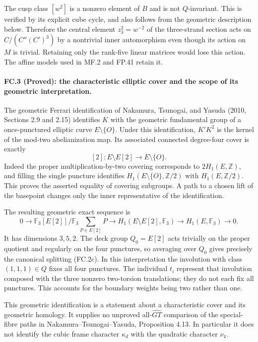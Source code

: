 The cusp class $[w^2]$ is a nonzero element of $B$ and is not
$Q$-invariant. This is verified by its explicit cube cycle, and
also follows from the geometric description below. Therefore the
central element $z_3^2=w^{-2}$ of the three-strand section acts
on $C/(C''(C')^3)$ by a nontrivial inner automorphism even though
its action on $M$ is trivial. Retaining only the rank-five linear
matrices would lose this action. The affine models used in MF.2
and FP.41 retain it.

\paragraph{FC.3 (Proved): the characteristic elliptic cover and the scope of its geometric interpretation.}
The geometric Ferrari identification of Nakamura, Tsunogai, and
Yasuda (2010, Sections 2.9 and 2.15) identifies $K$ with the
geometric fundamental group of a once-punctured elliptic curve
$E\setminus\{O\}$. Under this identification, $K'K^2$ is the
kernel of the mod-two abelianization map. Its associated connected
degree-four cover is exactly
\[
       [2]:E\setminus E[2]\longrightarrow E\setminus\{O\}.
 \tag{FC.3a}
\]
Indeed the proper multiplication-by-two covering corresponds to
$2H_1(E,\mathbb Z)$, and filling the single puncture identifies
$H_1(E\setminus\{O\},\mathbb Z/2)$ with
$H_1(E,\mathbb Z/2)$. This proves the asserted equality of covering
subgroups. A path to a chosen lift of the basepoint changes only
the inner representative of the identification.

The resulting geometric exact sequence is
\[
 0\longrightarrow
 \mathbb F_3[E[2]]\Big/\mathbb F_3\sum_{P\in E[2]}P
 \longrightarrow H_1(E\setminus E[2],\mathbb F_3)
 \longrightarrow H_1(E,\mathbb F_3)\longrightarrow0.
 \tag{FC.3b}
\]
It has dimensions $3,5,2$. The deck group $Q_0=E[2]$
acts trivially on the proper quotient and regularly on the four
punctures, so averaging over $Q_0$ gives precisely the canonical
splitting (FC.2c). In this interpretation the involution with
class $(1,1,1)\in Q$ fixes all four punctures. The individual
$t_i$ represent that involution composed with the three nonzero
two-torsion translations; they do not each fix all punctures.
This accounts for the boundary weights being two rather than one.

This geometric identification is a statement about a characteristic
cover and its geometric homology. It supplies no unproved
all-$\widehat{GT}$ comparison of the special-fibre paths in
Nakamura--Tsunogai--Yasuda, Proposition 4.13. In particular it does
not identify the cubic frame character $\kappa_d$ with the
quadratic character $\nu_4$.

